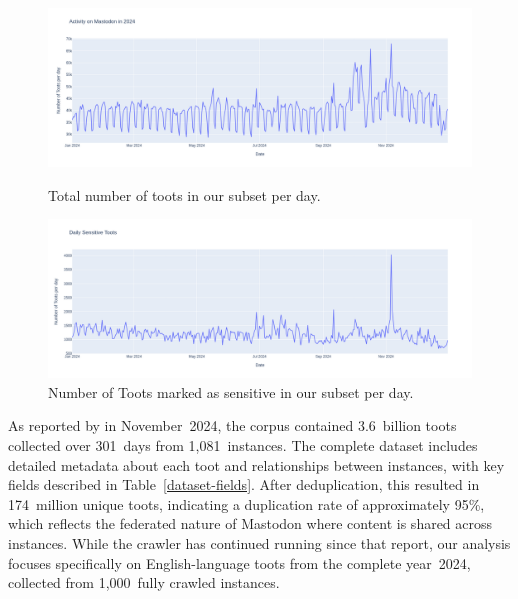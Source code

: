 \begin{figure}[tb]
    \centering
    \includegraphics[width=\textwidth]{../material/activity_2024.png}
    \caption{Total number of toots in our subset per day.}
    \label{toot-distribution}
    \includegraphics[width=\textwidth]{../material/sensitive_toots.png}
    \caption{Number of Toots marked as sensitive in our subset per day.}
    \label{sensitive-toots}
\end{figure}

As reported by \citet{ernst:2024} in November~2024, the corpus contained 3.6~billion toots collected over 301~days from 1,081~instances. The complete dataset includes detailed metadata about each toot and relationships between instances, with key fields described in Table~\ref{dataset-fields}. After deduplication, this resulted in 174~million unique toots, indicating a duplication rate of approximately 95\%, which reflects the federated nature of Mastodon where content is shared across instances. While the crawler has continued running since that report, our analysis focuses specifically on English-language toots from the complete year~2024, collected from 1,000~fully crawled instances.

